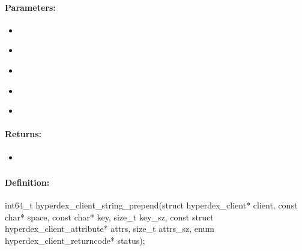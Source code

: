 \paragraph{Parameters:}
\begin{itemize}[noitemsep]
\item {}\\

\item {}\\

\item {}\\

\item {}\\

\item {}\\

\end{itemize}

\paragraph{Returns:}
\begin{itemize}[noitemsep]
\item {}\\

\end{itemize}

\pagebreak
\subsubsection{}
\label{api:c:string_prepend}


\paragraph{Definition:}
\begin{ccode}
int64_t hyperdex_client_string_prepend(struct hyperdex_client* client,
        const char* space,
        const char* key, size_t key_sz,
        const struct hyperdex_client_attribute* attrs, size_t attrs_sz,
        enum hyperdex_client_returncode* status);
\end{ccode}

